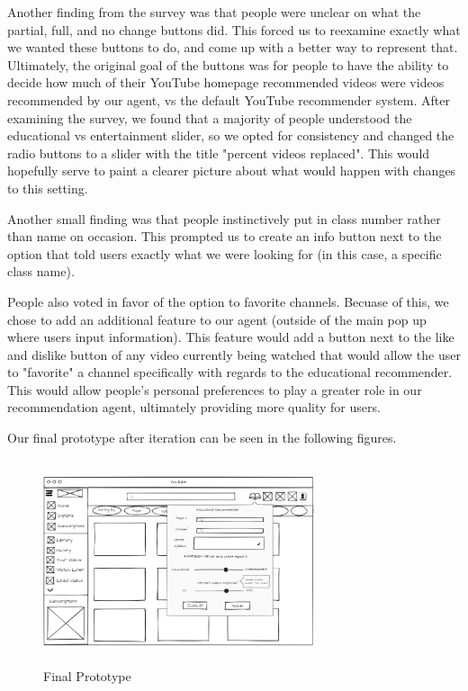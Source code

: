 \documentclass[letterpaper]{article} %
\begin{document}
Another finding from the survey was that people were unclear on what the partial, full, and no change buttons did. This forced us to reexamine exactly what we wanted these buttons to do, and come up with a better way to represent that. Ultimately, the original goal of the buttons was for people to have the ability to decide how much of their YouTube homepage recommended videos were videos recommended by our agent, vs the default YouTube recommender system. After examining the survey, we found that a majority of people understood the educational vs entertainment slider, so we opted for consistency and changed the radio buttons to a slider with the title "percent videos replaced". This would hopefully serve to paint a clearer picture about what would happen with changes to this setting.

Another small finding was that people instinctively put in class number rather than name on occasion. This prompted us to create an info button next to the option that told users exactly what we were looking for (in this case, a specific class name).

People also voted in favor of the option to favorite channels. Becuase of this, we chose to add an additional feature to our agent (outside of the main pop up where users input information). This feature would add a button next to the like and dislike button of any video currently being watched that would allow the user to "favorite" a channel specifically with regards to the educational recommender. This would allow people's personal preferences to play a greater role in our recommendation agent, ultimately providing more quality for users.

Our final prototype after iteration can be seen in the following figures.

\begin{figure}[h]
    \centering
    \includegraphics[width=8cm, height=6cm]{prototype.PNG}
    \caption{Final Prototype}
    \label{fig:prototype}
\end{figure}
\end{document}
